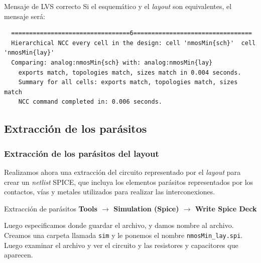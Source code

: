 \documentclass{beamer}
\begin{document}
\begin{frame}[fragile]{Mensaje de LVS correcto}
  Si el esquemático y el \emph{layout} son equivalentes, el mensaje será:
  \begin{tiny}
  \begin{verbatim}
  =================================6=================================
  Hierarchical NCC every cell in the design: cell 'nmosMin{sch}'  cell 'nmosMin{lay}'
  Comparing: analog:nmosMin{sch} with: analog:nmosMin{lay}
    exports match, topologies match, sizes match in 0.004 seconds.
    Summary for all cells: exports match, topologies match, sizes match
    NCC command completed in: 0.006 seconds.
  \end{verbatim}
\end{tiny}
\end{frame}
\subsection{Extracción de los parásitos}
\begin{frame}[fragile]
\frametitle{Extracción de los parásitos del layout}
Realizamos ahora una extracción del circuito representado por el \emph{layout} para crear un \emph{netlist} SPICE, que incluya los elementos parásitos representados por los contactos, vías y metales utilizados para realizar las interconexiones.

\begin{exampleblock}{Extracción de parásitos}
\textbf{
Tools $\rightarrow$ Simulation (Spice) $\rightarrow$ Write Spice Deck
}
\end{exampleblock}

Luego especificamos donde guardar el archivo, y damos nombre al archivo. Creamos una carpeta llamada \verb.sim. y le ponemos el nombre \verb(nmosMin_lay.spi(. Luego examinar el archivo y ver el circuito y las resistores y capacitores que aparecen.

\end{frame}
\end{document}
